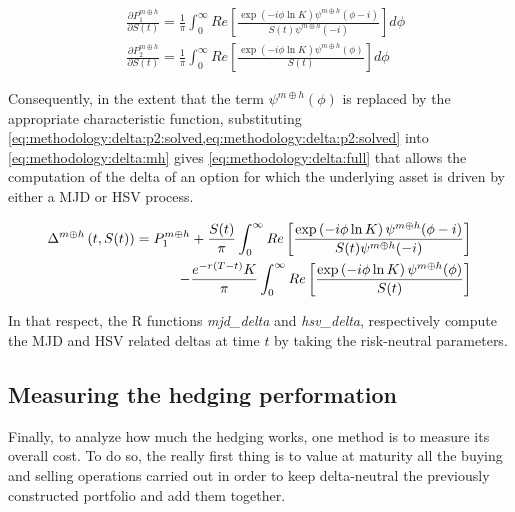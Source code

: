 \documentclass[12pt]{report}
\begin{document}
\begin{align}
&\frac{\partial P_1^{m \oplus h}}{\partial S(t)} = 
  \frac{1}{\pi}
  \int_0^{\infty} Re \left[
    \frac{\exp\left( -i \phi \ln K \right) \psi^{m \oplus h}(\phi -i)}
      {S(t)\psi^{m \oplus h}(-i)}
  \right] d\phi \label{eq:methodology:delta:p1:solved} \\
&\frac{\partial P_2^{m \oplus h}}{\partial S(t)} =
\frac{1}{\pi}
  \int_0^{\infty} Re \left[
    \frac{\exp\left( -i \phi \ln K \right) \psi^{m \oplus h}(\phi)}
      {S(t)}
  \right]d\phi \label{eq:methodology:delta:p2:solved}
\end{align}

Consequently, in the extent that the term $\psi^{m \oplus h}(\phi)$ is replaced by the appropriate characteristic function, substituting \cref{eq:methodology:delta:p2:solved,eq:methodology:delta:p2:solved} into \ref{eq:methodology:delta:mh} gives \ref{eq:methodology:delta:full} that allows the computation of the delta of an option for which the underlying asset is driven by either a MJD or HSV process.


\begin{align}
  \Delta^{m \oplus h}\left(t, S(t)\right)  =
  P_1^{m \oplus h} + 
  \frac{S(t)}{\pi}
    \int_0^{\infty} Re \left[
    \frac{\exp\left( -i \phi \ln K \right) \psi^{m \oplus h}(\phi -i)}
      {S(t)\psi^{m \oplus h}(-i)}
  \right] \notag\\
    \mspace{150mu}
  - \frac{e^{-r(T-t)} K}{\pi}
    \int_0^{\infty} Re \left[
    \frac{\exp\left( -i \phi \ln K \right) \psi^{m \oplus h}(\phi)}
      {S(t)}
  \right]
\label{eq:methodology:delta:full}
\end{align}

In that respect, the R functions \textit{mjd\_delta} and \textit{hsv\_delta}, respectively compute the MJD and HSV related deltas at time $t$ by taking the risk-neutral parameters.




\subsection{Measuring the hedging performation}
\label{sec:methodology:measuring}

Finally, to analyze how much the hedging works, one method is to measure its overall cost.
To do so, the really first thing is to value at maturity all the buying and selling operations carried out in order to keep delta-neutral the previously constructed portfolio and add them together.
\end{document}
